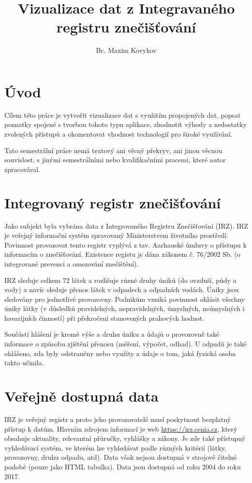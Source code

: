 \documentclass[12pt]{article}
\title{Vizualizace dat z Integravaného registru znečišťování}
\author{Bc. Maxim Kovykov}
\begin{document}
	
\begin{titlepage}
	\maketitle
	\thispagestyle{empty}
\end{titlepage}

\newpage


\section*{Úvod}
Cílem této práce je vytvořit vizualizace dat s využitím propojených dat, popsat poznatky spojené s tvorbou tohoto typu aplikace, zhodnotit výhody a nedostatky zvolených přístupů a okomentovat vhodnost technologií pro široké využívání.

Tato semestrální práce nemá textový ani věcný překryv, ani jinou věcnou souvislost, s jinými semestrálními nebo kvalifikačními pracemi, které autor zpracovával.


\section*{Integrovaný registr znečišťování}
Jako subjekt byla vybrána data z Integrovaného Registru Znečišťování (IRZ). IRZ je veřejný informační systém spravovaný Ministerstvem životního prostředí. Povinnost provozovat tento registr vyplývá z tzv. Aarhauské úmluvy o přístupu k informacím o znečišťování. Existence registu je dána zákonem č. 76/2002 Sb. (o integrované prevenci a omezování znečištění).

IRZ sleduje celkem 72 látek a rozlišuje různé druhy úniků (do ovzduší, půdy a vody) a navíc sleduje přenos látek v odpadech a odpadních vodách. Úniky jsou sledovány pro jednotlivé provozovny. Podnikům vzniká povinnost ohlásit všechny úniky látky (v důsledků pravidelných, nepravidelných, úmyslných, neúmyslných i havarijních činností) při překročení stanovených prahových hodnot.

Součástí hlášení je kromě výše a druhu úniku a údajů o provozovně také informace o způsobu zjištění přenosu (měření, výpočet, odhad). U odpadů je také ohlášeno, zda byly odstraněny nebo využity a údaje o tom, jaká fyzická osoba takto učinila.


\section*{Veřejně dostupná data}
IRZ je veřejný registr a proto jeho provozovatelé musí poskytnout bezplatný přístup k datům. Hlavním zdrojem informací je web \url{https://irz.cenia.cz}, který obsahuje aktuality, relevantní přůručky, vyhlášky a zákony. Je zde také přístupný vyhledávací systém, ve kterém lze vyhledávat podle různých kritérií (látky, provozovny, druhu odpadu, atd). Data však nejsou dostupná v strojově čitelné podobě (pouze jako HTML tabulka). Data jsou dostupná od roku 2004 do roku 2017.
\end{document}
